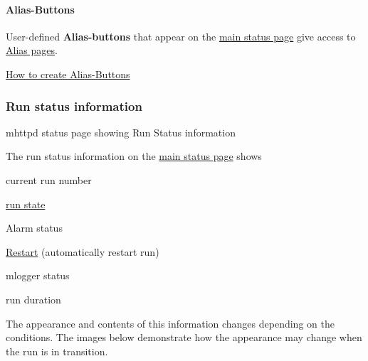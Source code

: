\par


\par
 \hypertarget{RC_mhttpd_status_page_features_RC_mhttpd_status_Alias_buttons}{}\paragraph{Alias-\/Buttons}\label{RC_mhttpd_status_page_features_RC_mhttpd_status_Alias_buttons}
User-\/defined {\bfseries Alias-\/buttons} that appear on the \hyperlink{RC_mhttpd_status_page_features_RC_mhpptd_optional_buttons}{main status page} give access to \hyperlink{RC_mhttpd_Alias_page}{Alias pages}.


\begin{DoxyItemize}
\item \hyperlink{RC_mhttpd_Alias_page_RC_mhttpd_alias_define}{How to create Alias-\/Buttons}
\end{DoxyItemize}

\par


\par
\hypertarget{RC_mhttpd_status_page_features_RC_mhttpd_status_Run_info}{}\subsubsection{Run status information}\label{RC_mhttpd_status_page_features_RC_mhttpd_status_Run_info}
\begin{center} mhttpd status page showing Run Status information  \end{center} \par


The run status information on the \hyperlink{RC_mhttpd_Main_Status_page_RC_mhttpd_main_status}{main status page} shows
\begin{DoxyItemize}
\item current run number
\item \hyperlink{RC_mhttpd_status_page_features_RC_table_run_state}{run state}
\item Alarm status
\item \hyperlink{F_Logging_Data_F_Logger_Auto_Restart}{Restart} (automatically restart run)
\item mlogger status
\item run duration
\end{DoxyItemize}

The appearance and contents of this information changes depending on the conditions. The images below demonstrate how the appearance may change when the run is in transition.

